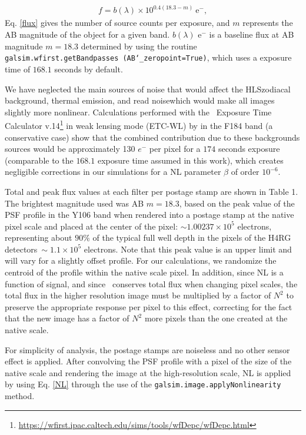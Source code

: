\documentclass[11pt,preprint,flushrt]{aastex}
\begin{document}
\begin{align}
f=b(\lambda)\times10^{0.4 (18.3-m)} \ \mathrm{e^-}, 
\label{flux}
\end{align}
Eq. \ref{flux} gives the number of source counts per exposure, and $m$ represents the AB magnitude of the object for a given band. $b(\lambda)$ e$^{-}$ is a baseline flux at AB magnitude $m=18.3$ determined by using the routine {\tt{galsim.wfirst.getBandpasses (AB\char`_zeropoint=True)}}, which uses a exposure time of $168.1$ seconds by default. 

We have neglected the main sources of noise that would affect the HLS\textemdash zodiacal background, thermal emission, and read noise\textemdash which would make all images slightly more nonlinear. Calculations performed with the \wfa\ Exposure Time Calculator v.14\footnote{\url{https://wfirst.ipac.caltech.edu/sims/tools/wfDepc/wfDepc.html}} \citep{hirata12} in weak lensing mode (ETC-WL) by \citealt{spergel15} in the F184 band (a conservative case) show that the combined contribution due to these backgrounds sources would be approximately 130 $e^-$ per pixel for a $174$ seconds exposure (comparable to the $168.1$ exposure time assumed in this work), which creates negligible corrections in our simulations for a NL parameter $\beta$ of order $10^{-6}$.

Total and peak flux values at each filter per postage stamp are shown in Table 1. The brightest magnitude used was AB $m=18.3$, based on the peak value of the PSF profile in the Y106 band when rendered into a postage stamp at the native pixel scale and placed at the center of the pixel: $\sim 1.00237\times10^{5}$ electrons, representing about $90\%$ of the typical full well depth in the pixels of the H4RG detectors\textemdash$\ \sim1.1\times10^{5}$ electrons. Note that this peak value is an upper limit and will vary for a slightly offset profile. For our calculations, we randomize the centroid of the profile within the native scale pixel. In addition, since NL is a function of signal, and since \gs\ conserves total flux when changing pixel scales, the total flux in the higher resolution image must be multiplied by a factor of $N^2$ to preserve the appropriate response per pixel to this effect, correcting for the fact that the new image has a factor of $N^2$ more pixels than the one created at the native scale. 

For simplicity of analysis, the postage stamps are noiseless and no other sensor effect is applied. After convolving the PSF profile with a pixel of the size of the native scale and rendering the image at the high-resolution scale, NL is applied by using Eq. \ref{NL} through the use of the {\tt{galsim.image.applyNonlinearity}} method. 
\end{document}

